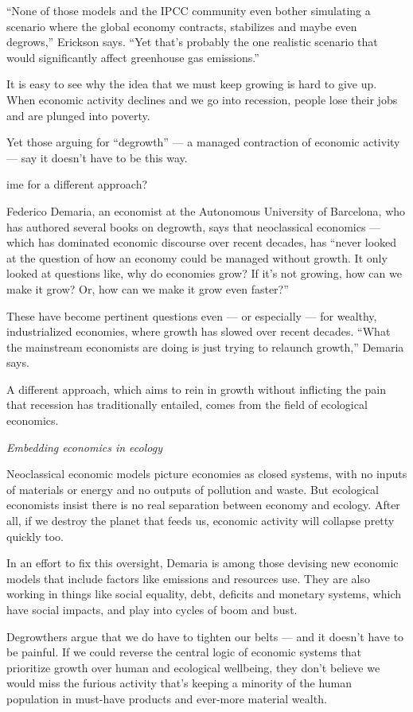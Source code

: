 \documentclass[
]{book}
\begin{document}
``None of those models and the IPCC community even bother simulating a scenario where the global economy contracts, stabilizes and maybe even degrows,'' Erickson says. ``Yet that's probably the one realistic scenario that would significantly affect greenhouse gas emissions.''

It is easy to see why the idea that we must keep growing is hard to give up. When economic activity declines and we go into recession, people lose their jobs and are plunged into poverty.

Yet those arguing for ``degrowth'' --- a managed contraction of economic activity--- say it doesn't have to be this way.

ime for a different approach?

Federico Demaria, an economist at the Autonomous University of Barcelona, who has authored several books on degrowth, says that neoclassical economics --- which has dominated economic discourse over recent decades, has ``never looked at the question of how an economy could be managed without growth. It only looked at questions like, why do economies grow? If it's not growing, how can we make it grow? Or, how can we make it grow even faster?''

These have become pertinent questions even --- or especially --- for wealthy, industrialized economies, where growth has slowed over recent decades. ``What the mainstream economists are doing is just trying to relaunch growth,'' Demaria says.

A different approach, which aims to rein in growth without inflicting the pain that recession has traditionally entailed, comes from the field of ecological economics.

\emph{Embedding economics in ecology}

Neoclassical economic models picture economies as closed systems, with no inputs of materials or energy and no outputs of pollution and waste. But ecological economists insist there is no real separation between economy and ecology. After all, if we destroy the planet that feeds us, economic activity will collapse pretty quickly too.

In an effort to fix this oversight, Demaria is among those devising new economic models that include factors like emissions and resources use. They are also working in things like social equality, debt, deficits and monetary systems, which have social impacts, and play into cycles of boom and bust.

Degrowthers argue that we do have to tighten our belts --- and it doesn't have to be painful. If we could reverse the central logic of economic systems that prioritize growth over human and ecological wellbeing, they don't believe we would miss the furious activity that's keeping a minority of the human population in must-have products and ever-more material wealth.
\end{document}
